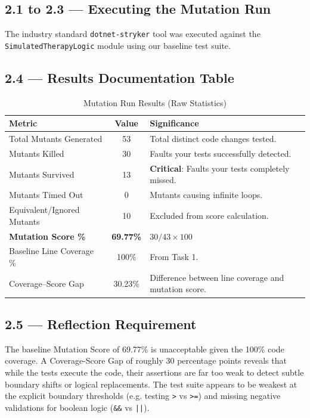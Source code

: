\documentclass[11pt,a4paper]{article}
\begin{document}
\subsection{2.1 to 2.3 — Executing the Mutation Run}
The industry standard \texttt{dotnet-stryker} tool was executed against the \texttt{SimulatedTherapyLogic} module using our baseline test suite.

\subsection{2.4 — Results Documentation Table}
\begin{table}[h!]
    \centering
    \renewcommand{\arraystretch}{1.3}
    \begin{tabularx}{\textwidth}{l c X}
        \toprule
        \textbf{Metric} & \textbf{Value} & \textbf{Significance} \\
        \midrule
        Total Mutants Generated & 53 & Total distinct code changes tested. \\
        Mutants Killed & 30 & Faults your tests successfully detected. \\
        Mutants Survived & 13 & \textbf{Critical}: Faults your tests completely missed. \\
        Mutants Timed Out & 0 & Mutants causing infinite loops. \\
        Equivalent/Ignored Mutants & 10 & Excluded from score calculation. \\
        \textbf{Mutation Score \%} & \textbf{69.77\%} & $30 / 43 \times 100$ \\
        Baseline Line Coverage \% & 100\% & From Task 1. \\
        Coverage–Score Gap & 30.23\% & Difference between line coverage and mutation score. \\
        \bottomrule
    \end{tabularx}
    \caption{Mutation Run Results (Raw Statistics)}
\end{table}

\subsection{2.5 — Reflection Requirement}
The baseline Mutation Score of 69.77\% is unacceptable given the 100\% code coverage. A Coverage-Score Gap of roughly 30 percentage points reveals that while the tests execute the code, their assertions are far too weak to detect subtle boundary shifts or logical replacements. The test suite appears to be weakest at the explicit boundary thresholds (e.g. testing \texttt{>} vs \texttt{>=}) and missing negative validations for boolean logic (\texttt{\&\&} vs \texttt{||}).
\end{document}
